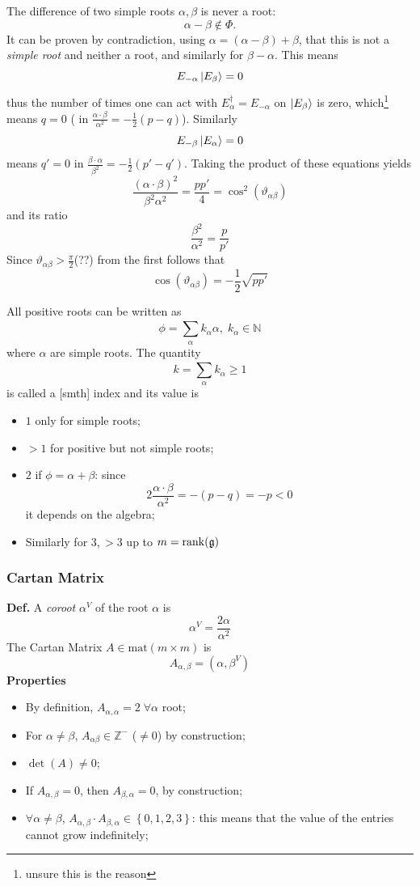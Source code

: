 The difference of two simple roots $\alpha,\beta$ is never a root:
\[
    \alpha-\beta\not\in\Phi.
\]
It can be proven by contradiction, using $\alpha=(\alpha-\beta)+\beta$, that this
is not a \textit{simple root} and neither a root, and similarly for $\beta-
\alpha$. This means
\[
    E_{-\alpha}\ket{E_\beta}=0
\]
thus the number of times one can act with $E_\alpha^\dagger =E_{-\alpha}$ on
$\ket{E_\beta}$ is zero, which\footnote{unsure this is the reason} means $q=0$ (
in $\frac{\alpha\cdot \beta}{\alpha^2}=-\frac{1}{2}(p-q)$).
Similarly
\[
    E_{-\beta}\ket{E_\alpha}=0
\]
means $q'=0$ in $\frac{\beta\cdot \alpha}{\beta^2}=-\frac{1}{2}(p'-q')$. Taking
the product of these equations yields
\[
    \frac{(\alpha\cdot \beta)^2}{\beta^2\alpha^2}=\frac{pp'}{4}=\cos^2(
    \vartheta_{\alpha\beta})
\]
and its ratio
\[
    \frac{\beta^2}{\alpha^2}=\frac{p}{p'}
\]
Since $\vartheta_{\alpha\beta}>\frac{\pi}{2}$(??) from the first follows that
\[
    \cos(\vartheta_{\alpha\beta})=-\frac{1}{2}\sqrt{pp'}
\]

All positive roots can be written as
\[
    \phi = \sum_{\alpha}^{} k_\alpha \alpha,\;k_\alpha\in\mathbb{N}
\]
where $\alpha$ are simple roots. The quantity
\[
    k=\sum_{\alpha}^{} k_\alpha\geq 1
\] is called a [smth] index and its value is
\begin{itemize}
    \item $1$ only for simple roots;
    \item $>1$ for positive but not simple roots;
    \item $2$ if $\phi=\alpha+\beta$: since 
        \[
            2\frac{\alpha\cdot \beta}{\alpha^2}=-(p-q)=-p<0
        \] it depends on the algebra;
    \item Similarly for $3, >3$ up to $m=\rank(\mathfrak{g})$
\end{itemize}

\subsubsection{Cartan Matrix}
\textbf{Def.} A \textit{coroot} $\alpha^V$ of the root $\alpha$ is
\[
    \alpha^V=\frac{2\alpha}{\alpha^2}
\]
The Cartan Matrix $A\in\text{mat}(m\times m)$ is
\[
    A_{\alpha,\beta}=(\alpha,\beta^V)
\]
\textbf{Properties}
\begin{itemize}
    \item By definition, $A_{\alpha,\alpha}=2\;\forall\alpha$ root;
    \item For $\alpha\neq\beta$, $A_{\alpha\beta}\in\mathbb{Z}^{-}$ ($\neq0$) by
        construction;
    \item $\det(A)\neq0$;
    \item If $A_{\alpha,\beta}=0$, then $A_{\beta,\alpha}=0$, by construction;
    \item $\forall\alpha\neq\beta$, $A_{\alpha,\beta}\cdot A_{\beta,\alpha}\in
        \left\{0,1,2,3\right\}$: this means that the value of the entries cannot
        grow indefinitely; 
\end{itemize}
